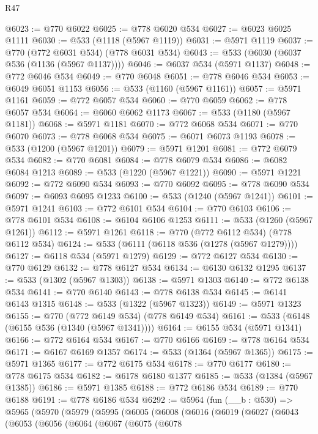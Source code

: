 \begin{lexlean}{R47}
\begin{coremodule}
@6023 := @770 @6022
@6025 := @778 @6020 @534
@6027 := @6023 @6025 @1111
@6030 := @533 (@1118 (@5967 @1119))
@6031 := @5971 @1119
@6037 := @770 (@772 @6031 @534) (@778 @6031 @534)
@6043 := @533 (@6030 (@6037 @536 (@1136 (@5967 @1137))))
@6046 := @6037 @534 (@5971 @1137)
@6048 := @772 @6046 @534
@6049 := @770 @6048
@6051 := @778 @6046 @534
@6053 := @6049 @6051 @1153
@6056 := @533 (@1160 (@5967 @1161))
@6057 := @5971 @1161
@6059 := @772 @6057 @534
@6060 := @770 @6059
@6062 := @778 @6057 @534
@6064 := @6060 @6062 @1173
@6067 := @533 (@1180 (@5967 @1181))
@6068 := @5971 @1181
@6070 := @772 @6068 @534
@6071 := @770 @6070
@6073 := @778 @6068 @534
@6075 := @6071 @6073 @1193
@6078 := @533 (@1200 (@5967 @1201))
@6079 := @5971 @1201
@6081 := @772 @6079 @534
@6082 := @770 @6081
@6084 := @778 @6079 @534
@6086 := @6082 @6084 @1213
@6089 := @533 (@1220 (@5967 @1221))
@6090 := @5971 @1221
@6092 := @772 @6090 @534
@6093 := @770 @6092
@6095 := @778 @6090 @534
@6097 := @6093 @6095 @1233
@6100 := @533 (@1240 (@5967 @1241))
@6101 := @5971 @1241
@6103 := @772 @6101 @534
@6104 := @770 @6103
@6106 := @778 @6101 @534
@6108 := @6104 @6106 @1253
@6111 := @533 (@1260 (@5967 @1261))
@6112 := @5971 @1261
@6118 := @770 (@772 @6112 @534) (@778 @6112 @534)
@6124 := @533 (@6111 (@6118 @536 (@1278 (@5967 @1279))))
@6127 := @6118 @534 (@5971 @1279)
@6129 := @772 @6127 @534
@6130 := @770 @6129
@6132 := @778 @6127 @534
@6134 := @6130 @6132 @1295
@6137 := @533 (@1302 (@5967 @1303))
@6138 := @5971 @1303
@6140 := @772 @6138 @534
@6141 := @770 @6140
@6143 := @778 @6138 @534
@6145 := @6141 @6143 @1315
@6148 := @533 (@1322 (@5967 @1323))
@6149 := @5971 @1323
@6155 := @770 (@772 @6149 @534) (@778 @6149 @534)
@6161 := @533 (@6148 (@6155 @536 (@1340 (@5967 @1341))))
@6164 := @6155 @534 (@5971 @1341)
@6166 := @772 @6164 @534
@6167 := @770 @6166
@6169 := @778 @6164 @534
@6171 := @6167 @6169 @1357
@6174 := @533 (@1364 (@5967 @1365))
@6175 := @5971 @1365
@6177 := @772 @6175 @534
@6178 := @770 @6177
@6180 := @778 @6175 @534
@6182 := @6178 @6180 @1377
@6185 := @533 (@1384 (@5967 @1385))
@6186 := @5971 @1385
@6188 := @772 @6186 @534
@6189 := @770 @6188
@6191 := @778 @6186 @534
@6292 := @5964
    (fun (__b : @530) =>
    @5965
      (@5970
        (@5979
          (@5995
            (@6005
              (@6008
                (@6016
                  (@6019
                    (@6027
                      (@6043
                        (@6053
                          (@6056
                            (@6064
                              (@6067
                                (@6075
                                  (@6078

\end{coremodule}
\end{lexlean}
